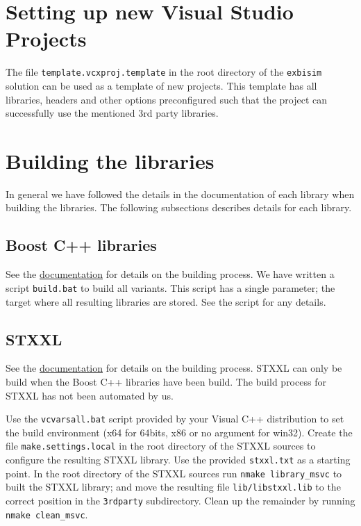 \documentclass{article}
\begin{document}
\section{Setting up new Visual Studio Projects}
The file {\tt template.vcxproj.template} in the root directory of the {\tt exbisim} solution can be used as a template of new projects. This template has all libraries, headers and other options preconfigured such that the project can successfully use the mentioned 3rd party libraries.

\section{Building the libraries}
In general we have followed the details in the documentation of each library when building the libraries. The following subsections describes details for each library.

\subsection{Boost C++ libraries}
See the \href{http://boost.org/more/getting_started/windows.html}{documentation} for details on the building process. We have written a script {\tt build.bat} to build all variants. This script has a single parameter; the target where all resulting libraries are stored. See the script for any details.

\subsection{STXXL}
See the \href{http://algo2.iti.kit.edu/stxxl/tags/1.3.1/installation_msvc.html}{documentation} for details on the building process. STXXL can only be build when the Boost C++ libraries have been build. The build process for STXXL has not been automated by us.

Use the {\tt vcvarsall.bat} script provided by your Visual C++ distribution to set the build environment (x64 for 64bits, x86 or no argument for win32). Create the file {\tt make.settings.local} in the root directory of the STXXL sources to configure the resulting STXXL library. Use the provided {\tt stxxl.txt} as a starting point. In the root directory of the STXXL sources run {\tt nmake library\_msvc} to built the STXXL library; and move the resulting file {\tt lib/libstxxl.lib} to the correct position in the {\tt 3rdparty} subdirectory. Clean up the remainder by running {\tt nmake clean\_msvc}.
\end{document}
